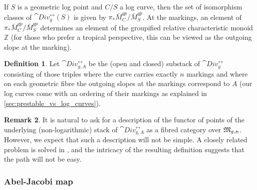 \documentclass[a4paper,12pt]{article} %
\newcommand{\bb}[1]{{\mathbb{#1}}}
\newcommand{\bd}[1]{{\mathbf{#1}}}
\newcommand{\ul}[1]{{\underline{#1}}}
\theoremstyle{definition}
\newtheorem{definition}{Definition} %
\newtheorem{remark}[definition]{Remark}
\theoremstyle{plain}%
\newcommand{\jocomment}[1]{}
\begin{document}
If $S$ is a geometric log point and $C/S$ a log curve, then the set of isomorphism classes of $\cat{Div}_g^{\rel}(S)$ is given by $\pi_*\bar M_C^{gp}/\bar M_S^{gp}$. At the markings, an element of $\pi_*\bar M_C^{gp}/\bar M_S^{gp}$ determines an element of the groupified relative characteristic monoid $\bb Z$ (for those who prefer a tropical perspective, this can be viewed as the outgoing slope at the marking). 

\begin{definition}
Let $\cat{Div}^{\rel}_{g,A}$ be the (open and closed) substack of $\cat{Div}^{\rel}_g$ consisting of those triples where the curve carries exactly $n$ markings and where on each geometric fibre the outgoing slopes at the markings correspond to $A$ (our
log curves come with an ordering of their markings as explained in \cref{sec:prestable_vs_log_curves}). 
\end{definition}



\begin{remark}
It is natural to ask for a description of the functor of points of the underlying (non-logarithmic) stack of $\cat{Div}^{\rel}_{g,A}$ as a fibred category over $\frak M_{g,n}$. However, we expect that such a description will not be simple. A closely related problem is solved in \cite{Biesel2016Fine-compactifi}, and the intricacy of the resulting definition suggests that the path will not be easy. 
\end{remark}


\subsubsection{Abel-Jacobi map}\label{sec:abel-jacobi-map}
\end{document}
